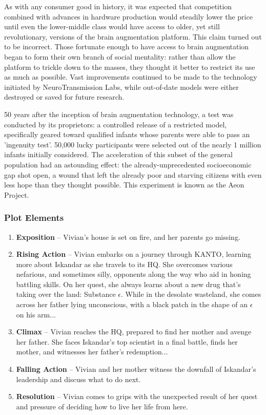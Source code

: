 \documentclass[12pt,titlepage]{article}
\newcommand\evilcorp{Iskandar\xspace}
\newcommand\world{KANTO\xspace}
\begin{document}
As with any consumer good in history, it was expected that competition combined
with advances in hardware production would steadily lower the price until even
the lower-middle class would have access to older, yet still revolutionary,
versions of the brain augmentation platform. This claim turned out to be
incorrect. Those fortunate enough to have access to brain augmentation began to
form their own branch of social mentality: rather than allow the platform to
trickle down to the masses, they thought it better to restrict its use as much
as possible. Vast improvements continued to be made to the technology initiated
by NeuroTransmission Labs, while out-of-date models were either destroyed or
saved for future research.

50 years after the inception of brain augmentation technology, a test was
conducted by its proprietors: a controlled release of a restricted model,
specifically geared toward qualified infants whose parents were able to pass an
'ingenuity test'. 50,000 lucky participants were selected out of the nearly 1
million infants initially considered. The acceleration of this subset of the
general population had an astounding effect: the already-unprecedented
socioeconomic gap shot open, a wound that left the already poor and starving
citizens with even less hope than they thought possible. This experiment is
known as the Aeon Project.

\subsubsection{Plot Elements}

\begin{enumerate}
    \item {\bf Exposition} -- Vivian's house is set on fire, and her parents go
    missing.
    \item {\bf Rising Action} -- Vivian embarks on a journey through \world,
    learning more about \evilcorp as she travels to its HQ. She overcomes
    various nefarious, and sometimes silly, opponents along the way who aid in
    honing battling skills. On her quest, she always learns about a new drug
    that's taking over the land: Substance $\epsilon$. While in the desolate
    wasteland, she comes across her father lying unconscious, with a black patch
    in the shape of an $\epsilon$ on his arm...
    \item {\bf Climax} -- Vivian reaches the HQ, prepared to find her mother and
    avenge her father. She faces \evilcorp's top scientist in a final battle,
    finds her mother, and witnesses her father's redemption...
    \item {\bf Falling Action} -- Vivian and her mother witness the downfall of
    \evilcorp's leadership and discuss what to do next.
    \item {\bf Resolution} -- Vivian comes to grips with the unexpected
    result of her quest and pressure of deciding how to live her life from here.
\end{enumerate}
\end{document}

